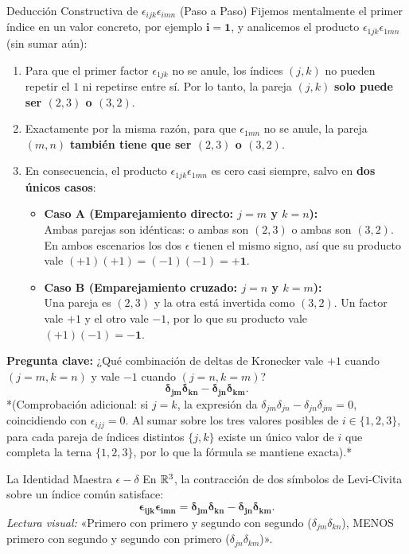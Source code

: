 \documentclass[11pt,letterpaper]{article}
\begin{document}
\begin{intuitionbox}{Deducción Constructiva de $\epsilon_{ijk}\epsilon_{imn}$ (Paso a Paso)}
Fijemos mentalmente el primer índice en un valor concreto, por ejemplo $\mathbf{i = 1}$, y analicemos el producto $\epsilon_{1jk}\epsilon_{1mn}$ (sin sumar aún):
\begin{enumerate}
    \item Para que el primer factor $\epsilon_{1jk}$ no se anule, los índices $(j, k)$ no pueden repetir el $1$ ni repetirse entre sí. Por lo tanto, la pareja $(j, k)$ \textbf{solo puede ser $(2, 3)$ o $(3, 2)$}.
    \item Exactamente por la misma razón, para que $\epsilon_{1mn}$ no se anule, la pareja $(m, n)$ \textbf{también tiene que ser $(2, 3)$ o $(3, 2)$}.
    \item En consecuencia, el producto $\epsilon_{1jk}\epsilon_{1mn}$ es cero casi siempre, salvo en \textbf{dos únicos casos}:
    \begin{itemize}
        \item \textbf{Caso A (Emparejamiento directo: $j = m$ y $k = n$):}\\
        Ambas parejas son idénticas: o ambas son $(2, 3)$ o ambas son $(3, 2)$. En ambos escenarios los dos $\epsilon$ tienen el mismo signo, así que su producto vale $(+1)(+1) = (-1)(-1) = \mathbf{+1}$.
        \item \textbf{Caso B (Emparejamiento cruzado: $j = n$ y $k = m$):}\\
        Una pareja es $(2, 3)$ y la otra está invertida como $(3, 2)$. Un factor vale $+1$ y el otro vale $-1$, por lo que su producto vale $(+1)(-1) = \mathbf{-1}$.
    \end{itemize}
\end{enumerate}
\textbf{Pregunta clave:} ¿Qué combinación de deltas de Kronecker vale $+1$ cuando $(j=m, k=n)$ y vale $-1$ cuando $(j=n, k=m)$?
\[
\mathbf{\delta_{jm}\delta_{kn} - \delta_{jn}\delta_{km}}.
\]
*(Comprobación adicional: si $j=k$, la expresión da $\delta_{jm}\delta_{jn} - \delta_{jn}\delta_{jm} = 0$, coincidiendo con $\epsilon_{i jj} = 0$. Al sumar sobre los tres valores posibles de $i \in \{1, 2, 3\}$, para cada pareja de índices distintos $\{j, k\}$ existe un único valor de $i$ que completa la terna $\{1, 2, 3\}$, por lo que la fórmula se mantiene exacta).*
\end{intuitionbox}

\begin{theorembox}{La Identidad Maestra $\epsilon-\delta$}
En $\mathbb{R}^3$, la contracción de dos símbolos de Levi-Civita sobre un índice común satisface:
\[
\mathbf{\epsilon_{ijk}\epsilon_{imn} = \delta_{jm}\delta_{kn} - \delta_{jn}\delta_{km}}.
\]
\textit{Lectura visual:} «Primero con primero y segundo con segundo ($\delta_{jm}\delta_{kn}$), MENOS primero con segundo y segundo con primero ($\delta_{jn}\delta_{km}$)».
\end{theorembox}
\end{document}
